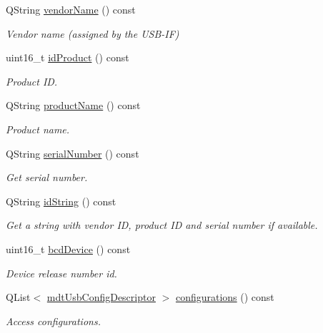 \begin{DoxyCompactItemize}
Q\-String \hyperlink{classmdt_usb_device_descriptor_ac2f746ebd5540b65bf00f82c991f5c3b}{vendor\-Name} () const 
\begin{DoxyCompactList}\small\item\em Vendor name (assigned by the U\-S\-B-\/\-I\-F) \end{DoxyCompactList}\item 
uint16\-\_\-t \hyperlink{classmdt_usb_device_descriptor_a951d3cb25a6f00cb19086bd38e9871f2}{id\-Product} () const 
\begin{DoxyCompactList}\small\item\em Product I\-D. \end{DoxyCompactList}\item 
Q\-String \hyperlink{classmdt_usb_device_descriptor_a626afc71d8e72600f12259ac6f5a5866}{product\-Name} () const 
\begin{DoxyCompactList}\small\item\em Product name. \end{DoxyCompactList}\item 
Q\-String \hyperlink{classmdt_usb_device_descriptor_a458951fc9443b80e93ad126dc1b56417}{serial\-Number} () const 
\begin{DoxyCompactList}\small\item\em Get serial number. \end{DoxyCompactList}\item 
Q\-String \hyperlink{classmdt_usb_device_descriptor_ad17a0b6a6bb67754c839f2c73d6df945}{id\-String} () const 
\begin{DoxyCompactList}\small\item\em Get a string with vendor I\-D, product I\-D and serial number if available. \end{DoxyCompactList}\item 
uint16\-\_\-t \hyperlink{classmdt_usb_device_descriptor_af2ed222ecd2f015f27b2e4c114721d11}{bcd\-Device} () const 
\begin{DoxyCompactList}\small\item\em Device release number id. \end{DoxyCompactList}\item 
Q\-List$<$ \hyperlink{classmdt_usb_config_descriptor}{mdt\-Usb\-Config\-Descriptor} $>$ \hyperlink{classmdt_usb_device_descriptor_a13619b1fba25f961da6c0289aef6ef06}{configurations} () const 
\begin{DoxyCompactList}\small\item\em Access configurations. \end{DoxyCompactList}\item 

\end{DoxyCompactItemize}

